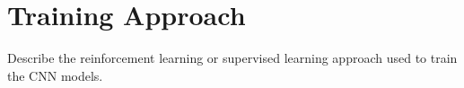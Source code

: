 \section{Training Approach}

\begin{outline}
  Describe the reinforcement learning or supervised learning approach
  used to train the CNN models.
\end{outline}

